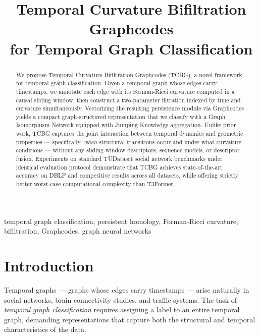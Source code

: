 \documentclass[conference]{IEEEtran}
\begin{document}
\title{Temporal Curvature Bifiltration Graphcodes\\for Temporal Graph Classification}

\author{
}

\maketitle

\begin{abstract}
We propose Temporal Curvature Bifiltration Graphcodes (TCBG), a novel
framework for temporal graph classification. Given a temporal graph whose
edges carry timestamps, we annotate each edge with its Forman-Ricci
curvature computed in a causal sliding window, then construct a
two-parameter filtration indexed by time and curvature simultaneously.
Vectorizing the resulting persistence module via Graphcodes yields a
compact graph-structured representation that we classify with a
Graph Isomorphism Network equipped with Jumping Knowledge aggregation.
Unlike prior work, TCBG captures the joint interaction between temporal
dynamics and geometric properties — specifically, \emph{when} structural
transitions occur and under what curvature conditions — without any
sliding-window descriptors, sequence models, or descriptor fusion.
Experiments on standard TUDataset social network benchmarks under
identical evaluation protocol demonstrate that TCBG achieves
state-of-the-art accuracy on DBLP and competitive results across all
datasets, while offering strictly better worst-case computational
complexity than T3Former.
\end{abstract}

\begin{IEEEkeywords}
temporal graph classification, persistent homology, Forman-Ricci curvature,
bifiltration, Graphcodes, graph neural networks
\end{IEEEkeywords}

\section{Introduction}
\label{sec:intro}

Temporal graphs — graphs whose edges carry timestamps — arise naturally
in social networks, brain connectivity studies, and traffic systems.
The task of \emph{temporal graph classification} requires assigning a
label to an entire temporal graph, demanding representations that capture
both the structural and temporal characteristics of the data.
\end{document}
